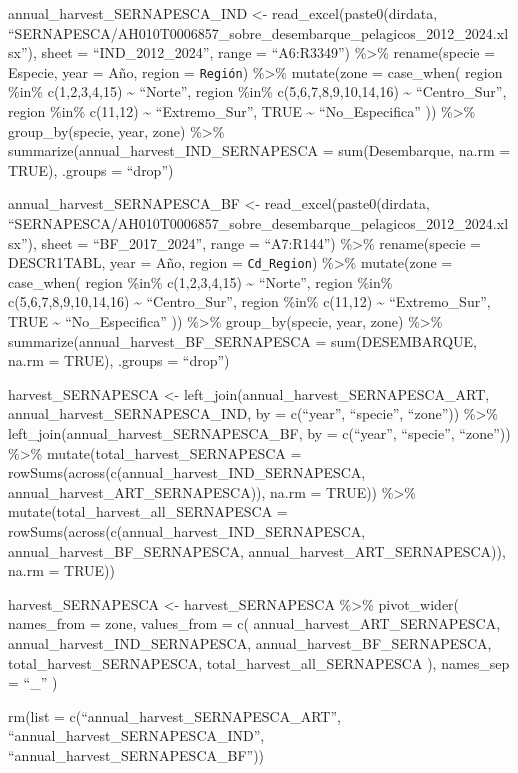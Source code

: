 annual\_harvest\_SERNAPESCA\_IND \textless- read\_excel(paste0(dirdata,
``SERNAPESCA/AH010T0006857\_sobre\_desembarque\_pelagicos\_2012\_2024.xlsx''),
sheet = ``IND\_2012\_2024'', range = ``A6:R3349'') \%\textgreater\%
rename(specie = Especie, year = Año, region = \texttt{Región})
\%\textgreater\% mutate(zone = case\_when( region \%in\% c(1,2,3,4,15)
\textasciitilde{} ``Norte'', region \%in\% c(5,6,7,8,9,10,14,16)
\textasciitilde{} ``Centro\_Sur'', region \%in\% c(11,12)
\textasciitilde{} ``Extremo\_Sur'', TRUE \textasciitilde{}
``No\_Especifica'' )) \%\textgreater\% group\_by(specie, year, zone)
\%\textgreater\% summarize(annual\_harvest\_IND\_SERNAPESCA =
sum(Desembarque, na.rm = TRUE), .groups = ``drop'')

annual\_harvest\_SERNAPESCA\_BF \textless- read\_excel(paste0(dirdata,
``SERNAPESCA/AH010T0006857\_sobre\_desembarque\_pelagicos\_2012\_2024.xlsx''),
sheet = ``BF\_2017\_2024'', range = ``A7:R144'') \%\textgreater\%
rename(specie = DESCR1TABL, year = Año, region = \texttt{Cd\_Region})
\%\textgreater\% mutate(zone = case\_when( region \%in\% c(1,2,3,4,15)
\textasciitilde{} ``Norte'', region \%in\% c(5,6,7,8,9,10,14,16)
\textasciitilde{} ``Centro\_Sur'', region \%in\% c(11,12)
\textasciitilde{} ``Extremo\_Sur'', TRUE \textasciitilde{}
``No\_Especifica'' )) \%\textgreater\% group\_by(specie, year, zone)
\%\textgreater\% summarize(annual\_harvest\_BF\_SERNAPESCA =
sum(DESEMBARQUE, na.rm = TRUE), .groups = ``drop'')

harvest\_SERNAPESCA \textless-
left\_join(annual\_harvest\_SERNAPESCA\_ART,
annual\_harvest\_SERNAPESCA\_IND, by = c(``year'', ``specie'',
``zone'')) \%\textgreater\% left\_join(annual\_harvest\_SERNAPESCA\_BF,
by = c(``year'', ``specie'', ``zone'')) \%\textgreater\%
mutate(total\_harvest\_SERNAPESCA =
rowSums(across(c(annual\_harvest\_IND\_SERNAPESCA,
annual\_harvest\_ART\_SERNAPESCA)), na.rm = TRUE)) \%\textgreater\%
mutate(total\_harvest\_all\_SERNAPESCA =
rowSums(across(c(annual\_harvest\_IND\_SERNAPESCA,
annual\_harvest\_BF\_SERNAPESCA, annual\_harvest\_ART\_SERNAPESCA)),
na.rm = TRUE))

harvest\_SERNAPESCA \textless- harvest\_SERNAPESCA \%\textgreater\%
pivot\_wider( names\_from = zone, values\_from = c(
annual\_harvest\_ART\_SERNAPESCA, annual\_harvest\_IND\_SERNAPESCA,
annual\_harvest\_BF\_SERNAPESCA, total\_harvest\_SERNAPESCA,
total\_harvest\_all\_SERNAPESCA ), names\_sep = ``\_'' )

rm(list = c(``annual\_harvest\_SERNAPESCA\_ART'',
``annual\_harvest\_SERNAPESCA\_IND'',
``annual\_harvest\_SERNAPESCA\_BF''))

